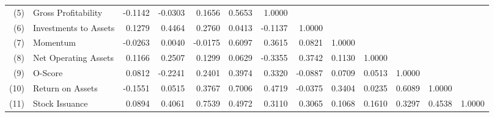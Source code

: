 \begin{sidewaystable}[hbt]
{\begin{tabular}{@{}rlrrrrrrrrrrr@{}}
(5) & Gross Profitability & -0.1142 & -0.0303 & 0.1656 & 0.5653 & 1.0000 &  &  &  &  &  &  \\
(6) & Investments to Assets & 0.1279 & 0.4464 & 0.2760 & 0.0413 & -0.1137 & 1.0000 &  &  &  &  &  \\
(7) & Momentum & -0.0263 & 0.0040 & -0.0175 & 0.6097 & 0.3615 & 0.0821 & 1.0000 &  &  &  &  \\
(8) & Net Operating Assets & 0.1166 & 0.2507 & 0.1299 & 0.0629 & -0.3355 & 0.3742 & 0.1130 & 1.0000 &  &  &  \\
(9) & O-Score & 0.0812 & -0.2241 & 0.2401 & 0.3974 & 0.3320 & -0.0887 & 0.0709 & 0.0513 & 1.0000 &  &  \\
(10) & Return on Assets & -0.1551 & 0.0515 & 0.3767 & 0.7006 & 0.4719 & -0.0375 & 0.3404 & 0.0235 & 0.6089 & 1.0000 &  \\
(11) & Stock Issuance & 0.0894 & 0.4061 & 0.7539 & 0.4972 & 0.3110 & 0.3065 & 0.1068 & 0.1610 & 0.3297 & 0.4538 & 1.0000 \\ \bottomrule
\end{tabular}%
}
\end{sidewaystable}